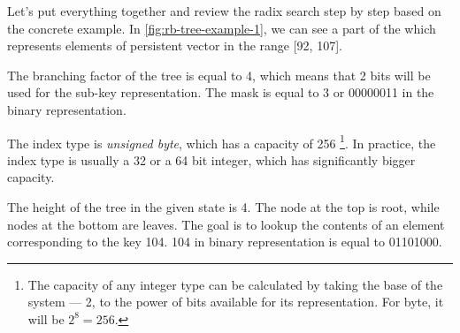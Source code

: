 \begin{figure}
\end{figure}

Let's put everything together and review the radix search step by step based on the concrete example. In \ref{fig:rb-tree-example-1}, we can see a part of the \rbtree which represents elements of persistent vector in the range [92, 107].

The branching factor of the tree is equal to 4, which means that 2 bits will be used for the sub-key representation. The mask is equal to 3 or 00000011 in the binary representation.

The index type is \emph{unsigned byte}, which has a capacity of 256 \footnote{The capacity of any integer type can be calculated by taking the base of the system --- 2, to the power of bits available for its representation. For byte, it will be $2^8 = 256$.}. In practice, the index type is usually a 32 or a 64 bit integer, which has significantly bigger capacity.

The height of the tree in the given state is 4. The node at the top is root, while nodes at the bottom are leaves. The goal is to lookup the contents of an element corresponding to the key 104. 104 in binary representation is equal to 01101000.

